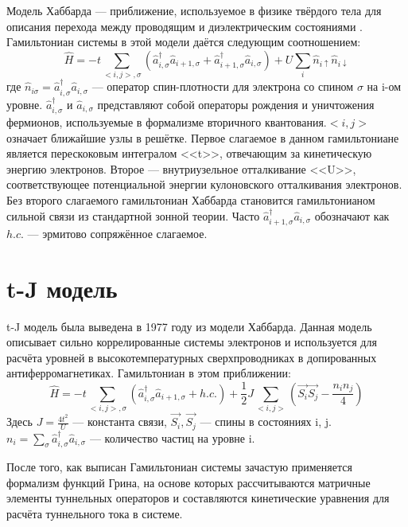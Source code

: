 \documentclass[12pt,a4paper]{report}
\begin{document}
Модель Хаббарда — приближение, используемое в физике твёрдого тела для описания перехода между проводящим и диэлектрическим состояниями \cite{Hubbard}. Гамильтониан системы в этой модели даётся следующим соотношением:
\begin{equation}
\hat{H} = -t \sum\limits_{<i, j>, \sigma}(\hat{a}_{i, \sigma}^{\dagger}\hat{a}_{i + 1, \sigma} + \hat{a}_{i+1, \sigma}^{\dagger}\hat{a}_{i, \sigma}) + U \sum\limits_{i}\hat{n}_{i \uparrow} \hat{n}_{i \downarrow}
\end{equation}
где $\hat{n}_{i \sigma} = \hat{a}_{i, \sigma}^{\dagger} \hat{a}_{i, \sigma}$  — оператор спин-плотности для электрона со спином $\sigma$ на i-ом уровне. $\hat{a}_{i, \sigma}^{\dagger}$ и $ \hat{a}_{i, \sigma}$ представляют собой операторы рождения и уничтожения фермионов, используемые в формализме вторичного квантования.$<i, j>$ означает ближайшие узлы в решётке. Первое слагаемое в данном гамильтониане является перескоковым интегралом <<t>>, отвечающим за кинетическую энергию электронов. Второе — внутриузельное отталкивание <<U>>, соответствующее потенциальной энергии кулоновского отталкивания электронов. Без второго слагаемого гамильтониан Хаббарда становится гамильтонианом сильной связи из стандартной зонной теории. Часто $\hat{a}_{i+1, \sigma}^{\dagger}\hat{a}_{i, \sigma}$ обозначают как $h.c.$ — эрмитово сопряжённое слагаемое.

\section{t-J модель}
t-J модель\cite{tJ} была выведена в 1977 году из модели Хаббарда. Данная модель описывает сильно коррелированные системы электронов и используется для расчёта уровней в высокотемпературных сверхпроводниках в допированных антиферромагнетиках. Гамильтониан в этом приближении:
\begin{equation}
\hat{H} = -t \sum\limits_{<i, j>, \sigma}(\hat{a}_{i, \sigma}^{\dagger}\hat{a}_{i + 1, \sigma} + h.c.) + \frac{1}{2}J \sum\limits_{<i, j>}(\vec{S_i} \vec{S_j} - \frac{n_i n_j}{4})
\end{equation}
Здесь $J = \frac{4 t^2}{U}$ — константа связи, $\vec{S_i}, \vec{S_j}$ — спины в состояниях  i, j. $n_i = \sum\limits_{\sigma} \hat{a}_{i, \sigma}^{\dagger} \hat{a}_{i, \sigma}$ — количество частиц на уровне i.

После того, как выписан Гамильтониан системы зачастую применяется формализм функций Грина\cite{Masl}, на основе которых рассчитываются матричные элементы туннельных операторов и составляются кинетические уравнения для расчёта туннельного тока в системе.
\end{document}
